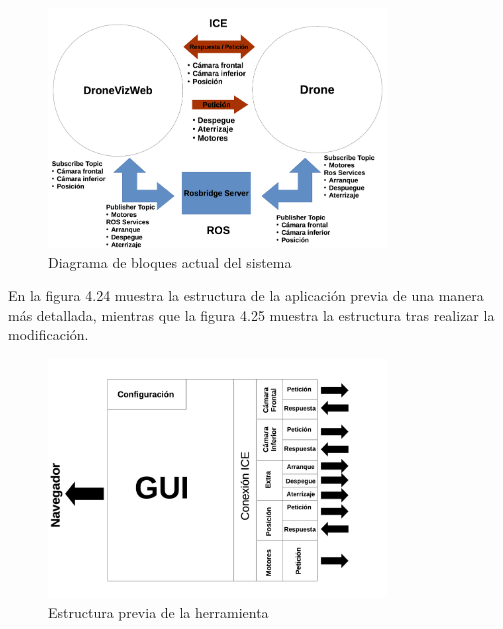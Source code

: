 \begin{figure}[H]
  \begin{center}
    \includegraphics[width=0.8\textwidth]{figures/DroneViz2.png}
		\caption{Diagrama de bloques actual del sistema}
		\label{fig.esquematurtlebot2}
		\end{center}
\end{figure}

En la figura 4.24 muestra la estructura de la aplicación previa de una manera más detallada, mientras que la figura 4.25 muestra la estructura tras realizar la modificación.

\begin{figure}[H]
  \begin{center}
    \includegraphics[width=0.8\textwidth]{figures/estrucuturadroneviz1.png}
		\caption{Estructura previa de la herramienta}
		\label{fig.estructuracamviz2}
		\end{center}
\end{figure}

